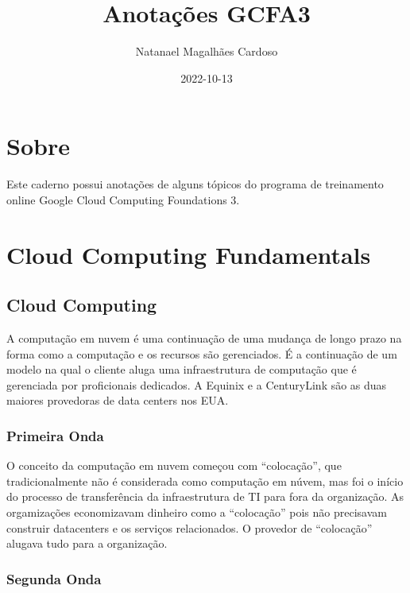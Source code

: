 \documentclass[
]{book}
\title{Anotações GCFA3}
\author{Natanael Magalhães Cardoso}
\date{2022-10-13}
\begin{document}
\maketitle

{
\setcounter{tocdepth}{1}
\tableofcontents
}
\hypertarget{sobre}{%
\chapter{Sobre}\label{sobre}}

Este caderno possui anotações de alguns tópicos do programa de
treinamento online Google Cloud Computing Foundations 3.

\hypertarget{cloud-computing-fundamentals}{%
\chapter{Cloud Computing Fundamentals}\label{cloud-computing-fundamentals}}

\hypertarget{cloud-computing}{%
\section{Cloud Computing}\label{cloud-computing}}

A computação em nuvem é uma continuação de uma mudança de longo prazo na
forma como a computação e os recursos são gerenciados. É a continuação de um
modelo na qual o cliente aluga uma infraestrutura de computação que é gerenciada
por proficionais dedicados. A Equinix e a CenturyLink são as duas maiores
provedoras de data centers nos EUA.

\hypertarget{primeira-onda}{%
\subsection{Primeira Onda}\label{primeira-onda}}

O conceito da computação em nuvem começou com ``colocação'', que tradicionalmente
não é considerada como computação em núvem, mas foi o início do processo de
transferência da infraestrutura de TI para fora da organização. As orgamizações
economizavam dinheiro como a ``colocação'' pois não precisavam construir datacenters
e os serviços relacionados. O provedor de ``colocação'' alugava tudo para a organização.

\hypertarget{segunda-onda}{%
\subsection{Segunda Onda}\label{segunda-onda}}
\end{document}
